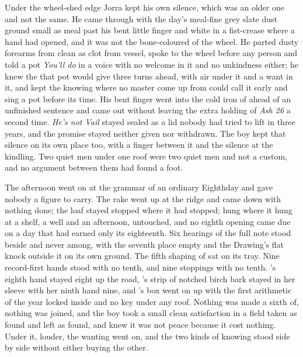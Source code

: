 Under the wheel-shed edge Jorra kept his own silence, which was an older one and not the same. He came through  with the day's meal-fine grey slate dust ground small as meal past his bent little finger and white in a fist-crease where a hand had opened, and it was not the bone-coloured  of the wheel. He parted dusty forearms from clean as clot from vessel, spoke to the wheel before any person and told a pot \emph{You'll do} in a voice with no welcome in it and no unkindness either; he knew the  that pot would give three turns ahead, with air under it and a want in it, and kept the knowing where no master come up from  could call it early and sing a pot before its time. His bent finger went into the cold iron of  ahead of an unfinished sentence and came out without leaving the extra holding of \emph{Ash 26} a second time. \emph{He's not Vail} stayed sealed as a lid nobody had tried to lift in three years, and the promise stayed neither given nor withdrawn. The boy kept that silence on its own place too, with a finger between it and the silence at the kindling. Two quiet men under one roof were two quiet men and not a custom, and no argument between them had found a foot.

The afternoon went on at the grammar of an ordinary Eighthday and gave nobody a figure to carry. The rake went up at the ridge and came down with nothing done; the loaf stayed stopped where it had stopped;  hung where it hung at a shelf, a well and an afternoon, untouched, and no eighth opening came due on a day that had earned only its eighteenth. Six hearings of the full note stood beside and never among, with the seventh place empty and the Drawing's flat knock outside it on its own ground. The fifth shaping of  sat on its tray. Nine record-first hands stood with no tenth, and nine stoppings with no tenth. 's eighth hand stayed eight up the road, 's strip of notched birch bark stayed in her sleeve with her ninth hand nine, and 's box went on up  with the first arithmetic of the year locked inside and no key under any roof. Nothing was made a sixth of, nothing was joined, and the boy took a small clean satisfaction in a field taken as found and left as found, and knew it was not peace because it cost nothing. Under it, louder, the wanting went on, and the two kinds of knowing stood side by side without either buying the other.

